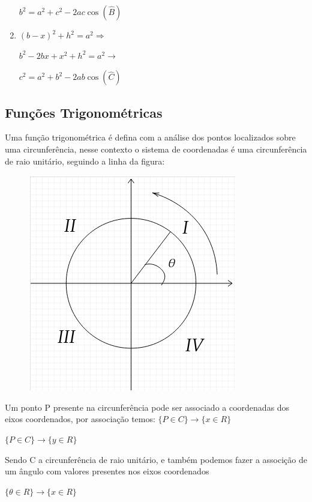 \begin{multicols*}{2}
\begin{enumerate}
              $b^2 = a^2 + c^2 - 2ac \cos (\widehat{B})$

        \item $(b - x)^2 + h^2 = a^2 \Rightarrow$

              $b^2 -2bx + x^2 + h^2 = a^2 \rightarrow$

              $ c^2 = a^2 + b^2 - 2ab \cos(\widehat{C}) $
    \end{enumerate}


    \subsection{Funções Trigonométricas}

    Uma função trigonométrica é defina com a análise dos pontos localizados sobre uma circunferência, nesse contexto o sistema de coordenadas é uma circunferência de raio unitário, seguindo a linha da figura:

    \begin{figure}[H]
        \centering
        \includegraphics[scale=0.5]{assets/rafael/img31.png}
    \end{figure}

    Um ponto P presente na circunferência pode ser associado a coordenadas dos eixos coordenados, por associação temos:
    $\{ P \in C\} \rightarrow \{x \in R\}$

    $\{ P \in C\} \rightarrow \{y \in R\}$

    Sendo C a circunferência de raio unitário, e também podemos fazer a associção de um ângulo com valores presentes nos eixos coordenados

    $\{\theta \in R \} \rightarrow \{x \in R\}$


\end{multicols*}
